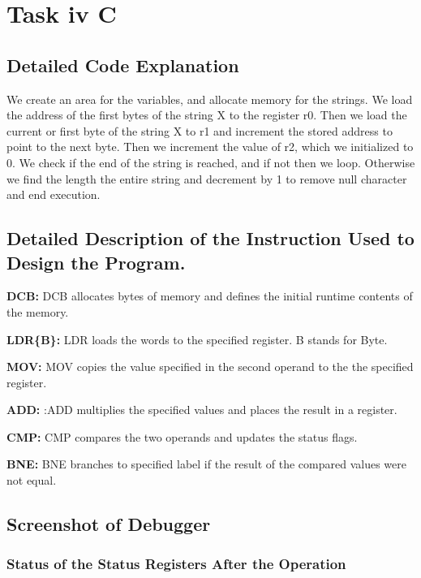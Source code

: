 \documentclass{article}
\begin{document}
\section{Task iv C}

\subsection{Detailed Code Explanation}
We create an area for the variables, and allocate memory for the strings. We load the address of the first bytes of the string X to the register r0. Then we load the current or first byte of the string X to r1 and increment the stored address to point to the next byte. Then we increment the value of r2, which we initialized to 0. We check if the end of the string is reached, and if not then we loop. Otherwise we find the length the entire string and decrement by 1 to remove null character and end execution.

\subsection{Detailed Description of the Instruction Used to Design the Program.}

\item \textbf{DCB: }DCB allocates bytes of memory and defines the initial runtime contents of the memory.
\item \textbf{LDR\{B\}: }LDR loads the words to the specified register. B stands for Byte.
\item \textbf{MOV: }MOV copies the value specified in the second operand to the the specified register.
\item \textbf{ADD: }:ADD multiplies the specified values and places the result in a register.
\item \textbf{CMP: }CMP compares the two operands and updates the status flags.
\item \textbf{BNE: }BNE branches to specified label if the result of the compared values were not equal.

\subsection{Screenshot of Debugger}

\subsubsection{Status of the Status Registers After the Operation}
\end{document}
